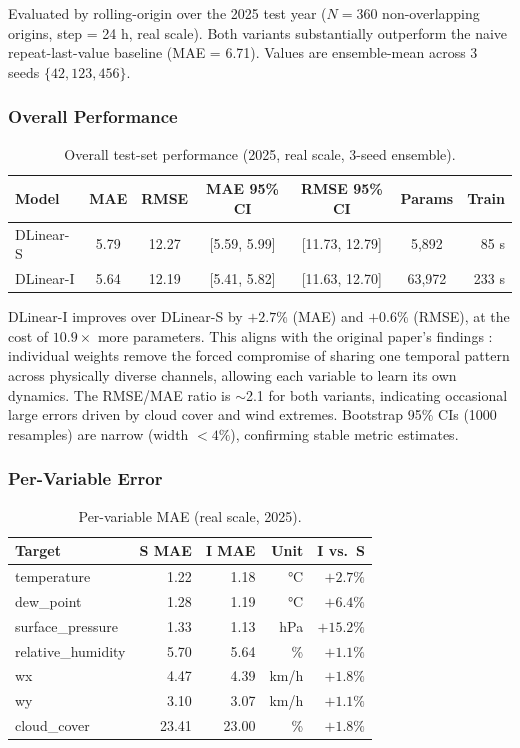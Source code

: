 \documentclass[12pt,a4paper,oneside]{report}
\begin{document}
Evaluated by rolling-origin over the 2025 test year ($N = 360$ non-overlapping
origins, step = 24 h, real scale). Both variants substantially outperform the
naive repeat-last-value baseline (MAE = 6.71). Values are ensemble-mean across
3 seeds $\{42, 123, 456\}$.

\subsubsection{Overall Performance}

\begin{table}[H]
\centering
\caption{Overall test-set performance (2025, real scale, 3-seed ensemble).}
\label{tab:dlinear-overall}
\begin{tabular}{lcccccr}
\toprule
\textbf{Model} & \textbf{MAE} & \textbf{RMSE} & \textbf{MAE 95\% CI} &
\textbf{RMSE 95\% CI} & \textbf{Params} & \textbf{Train} \\
\midrule
DLinear-S & 5.79 & 12.27 & [5.59, 5.99] & [11.73, 12.79] & 5,892   & 85 s \\
DLinear-I & 5.64 & 12.19 & [5.41, 5.82] & [11.63, 12.70] & 63,972  & 233 s \\
\bottomrule
\end{tabular}
\end{table}

DLinear-I improves over DLinear-S by $+2.7\%$ (MAE) and $+0.6\%$ (RMSE), at the
cost of $10.9\times$ more parameters. This aligns with the original paper's
findings \citep{zeng2023dlinear}: individual weights remove the forced compromise
of sharing one temporal pattern across physically diverse channels, allowing each
variable to learn its own dynamics. The RMSE/MAE ratio is $\sim$2.1 for both
variants, indicating occasional large errors driven by cloud cover and wind
extremes. Bootstrap 95\% CIs (1000 resamples) are narrow (width $<4\%$),
confirming stable metric estimates.

\subsubsection{Per-Variable Error}

\begin{table}[H]
\centering
\caption{Per-variable MAE (real scale, 2025).}
\label{tab:dlinear-pervar}
\begin{tabular}{lrrrr}
\toprule
\textbf{Target} & \textbf{S MAE} & \textbf{I MAE} & \textbf{Unit} & \textbf{I vs.\ S} \\
\midrule
temperature       & 1.22 & 1.18 & °C   & $+2.7\%$ \\
dew\_point        & 1.28 & 1.19 & °C   & $+6.4\%$ \\
surface\_pressure & 1.33 & 1.13 & hPa  & $+15.2\%$ \\
relative\_humidity& 5.70 & 5.64 & \%   & $+1.1\%$ \\
wx                & 4.47 & 4.39 & km/h & $+1.8\%$ \\
wy                & 3.10 & 3.07 & km/h & $+1.1\%$ \\
cloud\_cover      & 23.41& 23.00& \%   & $+1.8\%$ \\
\bottomrule
\end{tabular}
\end{table}
\end{document}
